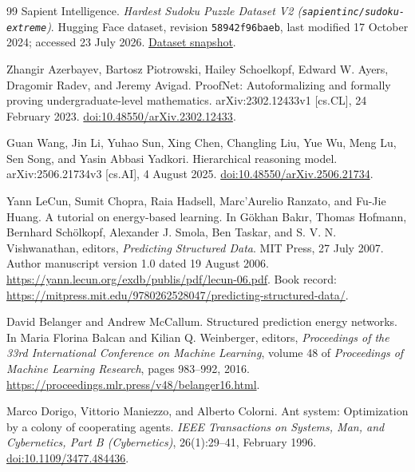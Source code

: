 \documentclass[11pt,oneside]{book}
\theoremstyle{remark}
\begin{document}
\begin{thebibliography}{99}
Sapient Intelligence.
\newblock \emph{Hardest Sudoku Puzzle Dataset V2
(\texttt{sapientinc/sudoku-extreme})}.
\newblock Hugging Face dataset, revision
\texttt{58942f96baeb},
last modified 17 October 2024; accessed 23 July 2026.
\newblock
\href{https://huggingface.co/datasets/sapientinc/sudoku-extreme/tree/58942f96baeb572ca3127e2a9e9c70f330783d6b}
{Dataset snapshot}.

Zhangir Azerbayev, Bartosz Piotrowski, Hailey Schoelkopf, Edward W. Ayers,
Dragomir Radev, and Jeremy Avigad.
\newblock ProofNet: Autoformalizing and formally proving undergraduate-level
mathematics.
\newblock arXiv:2302.12433v1 [cs.CL], 24 February 2023.
\newblock
\href{https://doi.org/10.48550/arXiv.2302.12433}
{doi:10.48550/arXiv.2302.12433}.

Guan Wang, Jin Li, Yuhao Sun, Xing Chen, Changling Liu, Yue Wu, Meng Lu,
Sen Song, and Yasin Abbasi Yadkori.
\newblock Hierarchical reasoning model.
\newblock arXiv:2506.21734v3 [cs.AI], 4 August 2025.
\newblock \href{https://doi.org/10.48550/arXiv.2506.21734}
{doi:10.48550/arXiv.2506.21734}.

Yann LeCun, Sumit Chopra, Raia Hadsell, Marc'Aurelio Ranzato, and Fu-Jie
Huang.
\newblock A tutorial on energy-based learning.
\newblock In G\"okhan Bak{\i}r, Thomas Hofmann, Bernhard Sch\"olkopf, Alexander J.
Smola, Ben Taskar, and S. V. N. Vishwanathan, editors,
\emph{Predicting Structured Data}. MIT Press, 27 July 2007.
\newblock Author manuscript version 1.0 dated 19 August 2006.
\newblock \url{https://yann.lecun.org/exdb/publis/pdf/lecun-06.pdf}.
\newblock Book record:
\url{https://mitpress.mit.edu/9780262528047/predicting-structured-data/}.

David Belanger and Andrew McCallum.
\newblock Structured prediction energy networks.
\newblock In Maria Florina Balcan and Kilian Q. Weinberger, editors,
\emph{Proceedings of the 33rd International Conference on Machine Learning},
volume 48 of \emph{Proceedings of Machine Learning Research}, pages 983--992,
2016.
\newblock \url{https://proceedings.mlr.press/v48/belanger16.html}.

Marco Dorigo, Vittorio Maniezzo, and Alberto Colorni.
\newblock Ant system: Optimization by a colony of cooperating agents.
\newblock \emph{IEEE Transactions on Systems, Man, and Cybernetics, Part B
(Cybernetics)}, 26(1):29--41, February 1996.
\newblock \href{https://doi.org/10.1109/3477.484436}
{doi:10.1109/3477.484436}.


\end{thebibliography}
\end{document}
